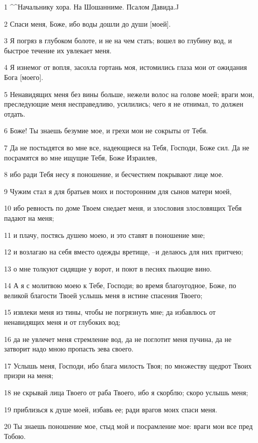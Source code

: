 \par 1 ^^Начальнику хора. На Шошанниме. Псалом Давида.^^
\par 2 Спаси меня, Боже, ибо воды дошли до души [моей].
\par 3 Я погряз в глубоком болоте, и не на чем стать; вошел во глубину вод, и быстрое течение их увлекает меня.
\par 4 Я изнемог от вопля, засохла гортань моя, истомились глаза мои от ожидания Бога [моего].
\par 5 Ненавидящих меня без вины больше, нежели волос на голове моей; враги мои, преследующие меня несправедливо, усилились; чего я не отнимал, то должен отдать.
\par 6 Боже! Ты знаешь безумие мое, и грехи мои не сокрыты от Тебя.
\par 7 Да не постыдятся во мне все, надеющиеся на Тебя, Господи, Боже сил. Да не посрамятся во мне ищущие Тебя, Боже Израилев,
\par 8 ибо ради Тебя несу я поношение, и бесчестием покрывают лице мое.
\par 9 Чужим стал я для братьев моих и посторонним для сынов матери моей,
\par 10 ибо ревность по доме Твоем снедает меня, и злословия злословящих Тебя падают на меня;
\par 11 и плачу, постясь душею моею, и это ставят в поношение мне;
\par 12 и возлагаю на себя вместо одежды вретище, --и делаюсь для них притчею;
\par 13 о мне толкуют сидящие у ворот, и поют в песнях пьющие вино.
\par 14 А я с молитвою моею к Тебе, Господи; во время благоугодное, Боже, по великой благости Твоей услышь меня в истине спасения Твоего;
\par 15 извлеки меня из тины, чтобы не погрязнуть мне; да избавлюсь от ненавидящих меня и от глубоких вод;
\par 16 да не увлечет меня стремление вод, да не поглотит меня пучина, да не затворит надо мною пропасть зева своего.
\par 17 Услышь меня, Господи, ибо блага милость Твоя; по множеству щедрот Твоих призри на меня;
\par 18 не скрывай лица Твоего от раба Твоего, ибо я скорблю; скоро услышь меня;
\par 19 приблизься к душе моей, избавь ее; ради врагов моих спаси меня.
\par 20 Ты знаешь поношение мое, стыд мой и посрамление мое: враги мои все пред Тобою.
